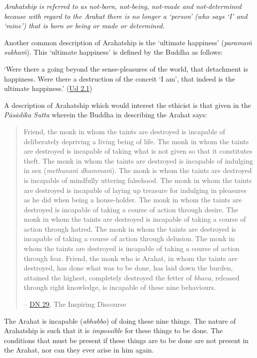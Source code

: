 \emph{Arahatship is referred to as not-born, not-being, not-made and not-determined because with regard to the Arahat there is no longer a `person' (who says `I' and `mine') that is born or being or made or determined.}

Another common description of Arahatship is the `ultimate happiness' (\textit{paramaṁ sukhaṁ}). This `ultimate happiness' is defined by the Buddha as follows:

`Were there a going beyond the sense-pleasures of the world, that detachment is happiness. Were there a destruction of the conceit `I am', that indeed is the ultimate happiness.' (\href{https://suttacentral.net/ud2.1/en/anandajoti}{Ud 2.1})

A description of Arahatship which would interest the ethicist is that given in the \textit{Pāsādika Sutta} wherein the Buddha in describing the Arahat says:

\begin{quote}
Friend, the monk in whom the taints are destroyed is incapable of deliberately depriving a living being of life. The monk in whom the taints are destroyed is incapable of taking what is not given so that it constitutes theft. The monk in whom the taints are destroyed is incapable of indulging in sex (\textit{methunaṁ dhammaṁ}). The monk is whom the taints are destroyed is incapable of mindfully uttering falsehood. The monk in whom the taints are destroyed is incapable of laying up treasure for indulging in pleasures as he did when being a house-holder. The monk in whom the taints are destroyed is incapable of taking a course of action through desire. The monk in whom the taints are destroyed is incapable of taking a course of action through hatred. The monk in whom the taints are destroyed is incapable of taking a course of action through delusion. The monk in whom the taints are destroyed is incapable of taking a course of action through fear. Friend, the monk who is Arahat, in whom the taints are destroyed, has done what was to be done, has laid down the burden, attained the highest, completely destroyed the fetter of \textit{bhava}, released through right knowledge, is incapable of these nine behaviours.

 -- \href{https://suttacentral.net/dn29/en/thanissaro}{DN 29}, The Inspiring Discourse
\end{quote}

The Arahat is incapable (\textit{abhabbo}) of doing these nine things. The nature of Arahatship is such that it is \emph{impossible} for these things to be done. The conditions that must be present if these things are to be done are not present in the Arahat, nor can they ever arise in him again.

